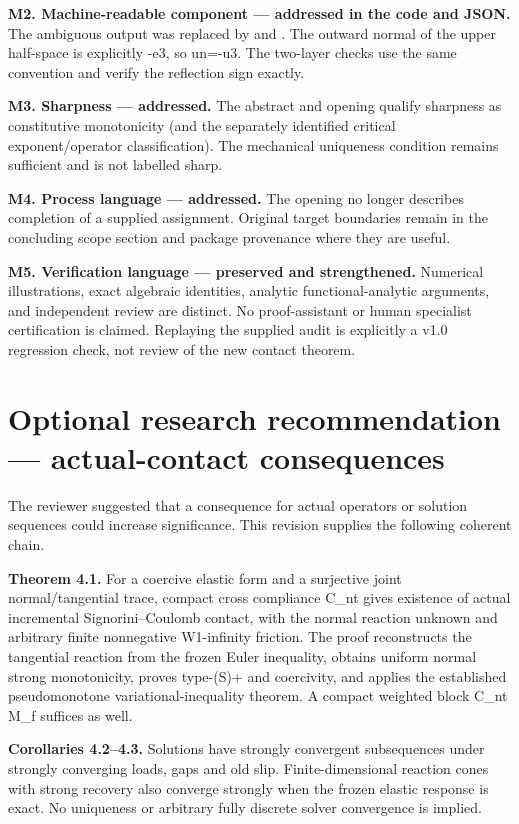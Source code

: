 \documentclass[11pt,a4paper]{article}
\begin{document}
\textbf{M2. Machine-readable component — addressed in the code and JSON.} The ambiguous  output was replaced by  and . The outward normal of the upper half-space is explicitly -e3, so un=-u3. The two-layer checks use the same convention and verify the reflection sign exactly.

\textbf{M3. Sharpness — addressed.} The abstract and opening qualify sharpness as constitutive monotonicity (and the separately identified critical exponent/operator classification). The mechanical uniqueness condition remains sufficient and is not labelled sharp.

\textbf{M4. Process language — addressed.} The opening no longer describes completion of a supplied assignment. Original target boundaries remain in the concluding scope section and package provenance where they are useful.

\textbf{M5. Verification language — preserved and strengthened.} Numerical illustrations, exact algebraic identities, analytic functional-analytic arguments, and independent review are distinct. No proof-assistant or human specialist certification is claimed. Replaying the supplied audit is explicitly a v1.0 regression check, not review of the new contact theorem.

\section*{Optional research recommendation — actual-contact consequences}

The reviewer suggested that a consequence for actual operators or solution sequences could increase significance. This revision supplies the following coherent chain.

\textbf{Theorem 4.1.} For a coercive elastic form and a surjective joint normal/tangential trace, compact cross compliance C\_nt gives existence of actual incremental Signorini–Coulomb contact, with the normal reaction unknown and arbitrary finite nonnegative W1-infinity friction. The proof reconstructs the tangential reaction from the frozen Euler inequality, obtains uniform normal strong monotonicity, proves type-(S)+ and coercivity, and applies the established pseudomonotone variational-inequality theorem. A compact weighted block C\_nt M\_f suffices as well.

\textbf{Corollaries 4.2–4.3.} Solutions have strongly convergent subsequences under strongly converging loads, gaps and old slip. Finite-dimensional reaction cones with strong recovery also converge strongly when the frozen elastic response is exact. No uniqueness or arbitrary fully discrete solver convergence is implied.
\end{document}
